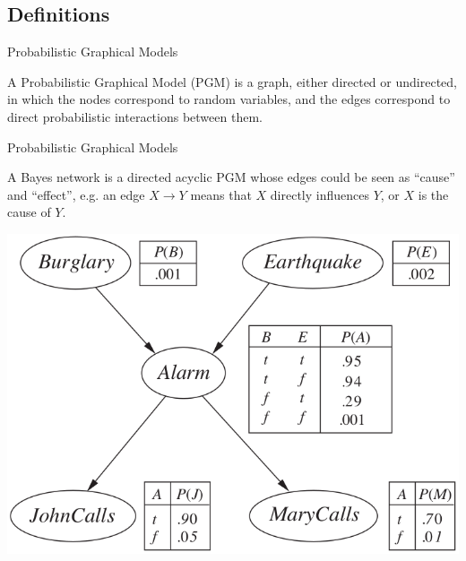\documentclass{beamer}
\begin{document}
\subsection{Definitions}
\begin{frame}{Probabilistic Graphical Models}
    \pause
    \begin{definition}
        A Probabilistic Graphical Model (PGM) is a graph, either directed or undirected, in which the nodes correspond to random variables,
        and the edges correspond to direct probabilistic interactions between them.
    \end{definition}
\end{frame}
\begin{frame}{Probabilistic Graphical Models}
    \pause
    \begin{definition}
        A Bayes network is a directed acyclic PGM whose edges could be seen as ``cause'' and ``effect'', e.g. an
        edge $ X \rightarrow Y $ means that $ X $ directly influences $ Y $, or $ X $ is the cause of $ Y $.
    \end{definition}
    \pause
    \begin{center}
        \includegraphics[scale=0.25]{bayesnet}
    \end{center}
\end{frame}
\end{document}
